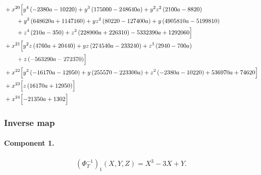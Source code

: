 \begin{align*}
&{}+x^{20}\Bigl[y^{4} \left(- 2380 a - 10220\right) + y^{3} \left(175000 - 248640 a\right) + y^{2} z^{2} \left(2100 a - 8820\right)\\
&\qquad + y^{2} \left(648620 a + 1147160\right) + y z^{2} \left(80220 - 127400 a\right) + y \left(4905810 a - 5199810\right)\\
&\qquad + z^{4} \left(210 a - 350\right) + z^{2} \left(228900 a + 226310\right) - 5332390 a + 1292060\Bigr]\\
&{}+x^{21}\Bigl[y^{2} z \left(4760 a + 20440\right) + y z \left(274540 a - 233240\right) + z^{3} \left(2940 - 700 a\right)\\
&\qquad + z \left(- 563290 a - 272370\right)\Bigr]\\
&{}+x^{22}\Bigl[y^{2} \left(- 16170 a - 12950\right) + y \left(255570 - 223300 a\right) + z^{2} \left(- 2380 a - 10220\right) + 536970 a + 74620\Bigr]\\
&{}+x^{23}\Bigl[z \left(16170 a + 12950\right)\Bigr]\\
&{}+x^{24}\Bigl[- 21350 a + 1302\Bigr]
\end{align*}
\endgroup

\subsubsection*{Inverse map}
\paragraph{Component 1.}
\begingroup
\allowdisplaybreaks[0]
\begin{gather*}
(\Phi_T^{-1})_1(X,Y,Z)=X^3-3X+Y.
\end{gather*}
\endgroup

